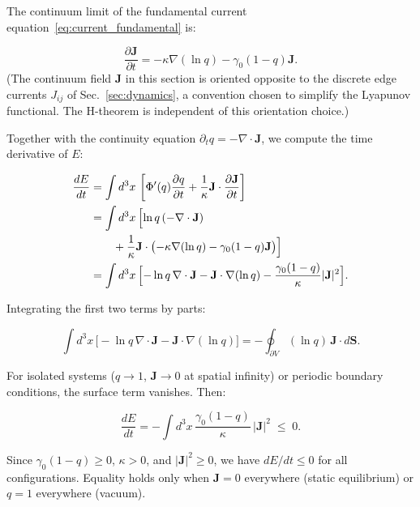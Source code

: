 \documentclass[aps,prd,twocolumn,showpacs,superscriptaddress,preprintnumbers]{revtex4-2}
\begin{document}
The continuum limit of the fundamental current equation~\eqref{eq:current_fundamental} is:

\begin{equation}
\frac{\partial \mathbf{J}}{\partial t} = -\kappa\nabla(\ln q) - \gamma_0(1-q)\mathbf{J}.
\label{eq:J_continuum}
\end{equation}
(The continuum field $\mathbf{J}$ in this section is oriented opposite to the discrete edge currents $J_{ij}$ of Sec.~\ref{sec:dynamics}, a convention chosen to simplify the Lyapunov functional. The H-theorem is independent of this orientation choice.)

Together with the continuity equation $\partial_t q = -\nabla\cdot\mathbf{J}$, we compute the time derivative of $E$:

\begin{align}
\frac{dE}{dt} &= \int d^3x\,\left[\Phi'(q)\frac{\partial q}{\partial t} + \frac{1}{\kappa}\mathbf{J}\cdot\frac{\partial\mathbf{J}}{\partial t}\right] \nonumber \\
&= \int d^3x\,\Bigl[\ln q\,(-\nabla\cdot\mathbf{J}) \nonumber \\
&\qquad + \frac{1}{\kappa}\mathbf{J}\cdot\bigl(-\kappa\nabla(\ln q) - \gamma_0(1-q)\mathbf{J}\bigr)\Bigr] \nonumber \\
&= \int d^3x\,\Bigl[-\ln q\,\nabla\cdot\mathbf{J} - \mathbf{J}\cdot\nabla(\ln q) - \frac{\gamma_0(1-q)}{\kappa}|\mathbf{J}|^2\Bigr].
\label{eq:dEdt_step1}
\end{align}

Integrating the first two terms by parts:

\begin{equation}
\int d^3x\,\bigl[-\ln q\,\nabla\cdot\mathbf{J} - \mathbf{J}\cdot\nabla(\ln q)\bigr] = -\oint_{\partial V} (\ln q)\,\mathbf{J}\cdot d\mathbf{S}.
\label{eq:boundary_term}
\end{equation}

For isolated systems ($q\to1$, $\mathbf{J}\to0$ at spatial infinity) or periodic boundary conditions, the surface term vanishes.
Then:

\begin{equation}
\boxed{\frac{dE}{dt} = -\int d^3x\,\frac{\gamma_0(1-q)}{\kappa}\,|\mathbf{J}|^2 \;\leq\; 0}.
\label{eq:dEdt_final}
\end{equation}

Since $\gamma_0(1-q)\geq0$, $\kappa>0$, and $|\mathbf{J}|^2\geq0$, we have $dE/dt\leq0$ for all configurations.
Equality holds only when $\mathbf{J}=0$ everywhere (static equilibrium) or $q=1$ everywhere (vacuum).
\end{document}
